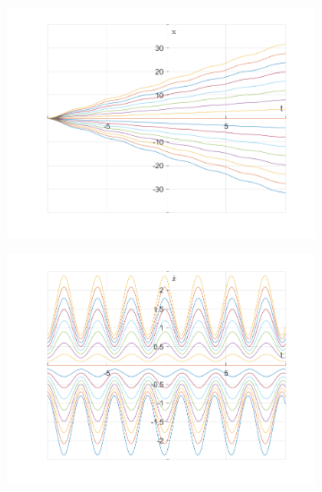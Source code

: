 \documentclass{article}
\begin{document}
	\begin{figure}[h!]
		\centering
		\begin{subfigure}[b]{0.48\linewidth}
			\includegraphics[width=\linewidth]{./SmallOscillations/S11/F3.png}
		\end{subfigure}
		\begin{subfigure}[b]{0.48\linewidth}
			\includegraphics[width=\linewidth]{./SmallOscillations/S11/F4.png}
		\end{subfigure}
	\end{figure}
	
\end{document}
